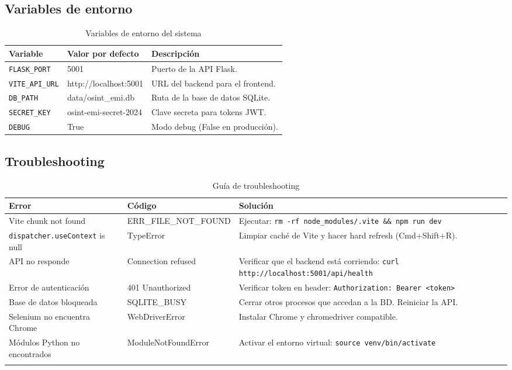 \documentclass[12pt,a4paper]{article}
\begin{document}
\subsection{Variables de entorno}
\begin{table}[H]
\centering
\begin{tabularx}{\textwidth}{l l X}
\toprule
\textbf{Variable} & \textbf{Valor por defecto} & \textbf{Descripción} \\
\midrule
\texttt{FLASK\_PORT} & 5001 & Puerto de la API Flask. \\
\texttt{VITE\_API\_URL} & http://localhost:5001 & URL del backend para el frontend. \\
\texttt{DB\_PATH} & data/osint\_emi.db & Ruta de la base de datos SQLite. \\
\texttt{SECRET\_KEY} & osint-emi-secret-2024 & Clave secreta para tokens JWT. \\
\texttt{DEBUG} & True & Modo debug (False en producción). \\
\bottomrule
\end{tabularx}
\caption{Variables de entorno del sistema}
\end{table}

\subsection{Troubleshooting}

\begin{longtable}{p{3.5cm} p{3cm} p{7cm}}
\toprule
\textbf{Error} & \textbf{Código} & \textbf{Solución} \\
\midrule
\endhead

Vite chunk not found & ERR\_FILE\_NOT\_FOUND & Ejecutar: \texttt{rm -rf node\_modules/.vite \&\& npm run dev} \\
\addlinespace

\texttt{dispatcher.useContext} is null & TypeError & Limpiar caché de Vite y hacer hard refresh (Cmd+Shift+R). \\
\addlinespace

API no responde & Connection refused & Verificar que el backend está corriendo: \texttt{curl http://localhost:5001/api/health} \\
\addlinespace

Error de autenticación & 401 Unauthorized & Verificar token en header: \texttt{Authorization: Bearer <token>} \\
\addlinespace

Base de datos bloqueada & SQLITE\_BUSY & Cerrar otros procesos que accedan a la BD. Reiniciar la API. \\
\addlinespace

Selenium no encuentra Chrome & WebDriverError & Instalar Chrome y chromedriver compatible. \\
\addlinespace

Módulos Python no encontrados & ModuleNotFoundError & Activar el entorno virtual: \texttt{source venv/bin/activate} \\

\bottomrule
\caption{Guía de troubleshooting}
\end{longtable}
\end{document}
